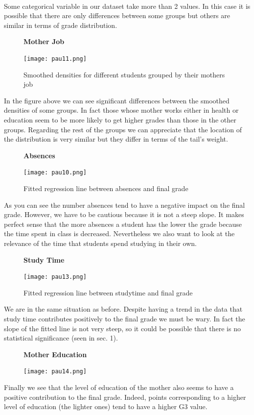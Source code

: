 \documentclass[a4paper, 11pt]{article}
\theoremstyle{definition}
\numberwithin{equation}{section}		%
\numberwithin{table}{section}				%
\begin{document}
\\[0.2in]
Some categorical variable in our dataset take more than 2 values. In this case it is possible that there are only differences between some groups but others are similar in terms of grade distribution.\\
\begin{figure}[h]\centering
\textbf{Mother Job}\par\medskip
\texttt{[image: pau11.png]}
\caption{Smoothed densities for different students grouped by their mothers job}
\end{figure}
In the figure above we can see significant differences between the smoothed densities of some groups. In fact those whose mother works either in health or education seem to be more likely to get higher grades than those in the other groups. Regarding the rest of the groups we can appreciate that the location of the distribution is very similar but they differ in terms of the tail's weight.\\
\begin{figure}[h]\centering
\textbf{Absences}\par\medskip
\texttt{[image: pau10.png]}
\caption{Fitted regression line between absences and final grade}
\end{figure}
As you can see the number absences tend to have a negative impact on the final grade. However, we have to be cautious because it is not a steep slope.
It makes perfect sense that the more absences a student has the lower the grade because the time spent in class is decreased. Nevertheless we also want to look at the relevance of the time that students spend studying in their own.
\begin{figure}[H]\centering
\textbf{Study Time}\par\medskip
\texttt{[image: pau13.png]}
\caption{Fitted regression line between studytime and final grade}
\end{figure}
We are in the same situation as before. Despite having a trend in the data that study time contributes positively to the final grade we must be wary. In fact the slope of the fitted line is not very steep, so it could be possible that there is no statistical significance (seen in sec. 1). \\[0.3in]
\begin{figure}[h]\centering
\textbf{Mother Education}\par\medskip
\texttt{[image: pau14.png]}
\end{figure}
Finally we see that the level of education of the mother also seems to have a positive contribution to the final grade. Indeed, points corresponding to a higher level of education (the lighter ones) tend to have a higher G3 value.
\newpage
\end{document}
